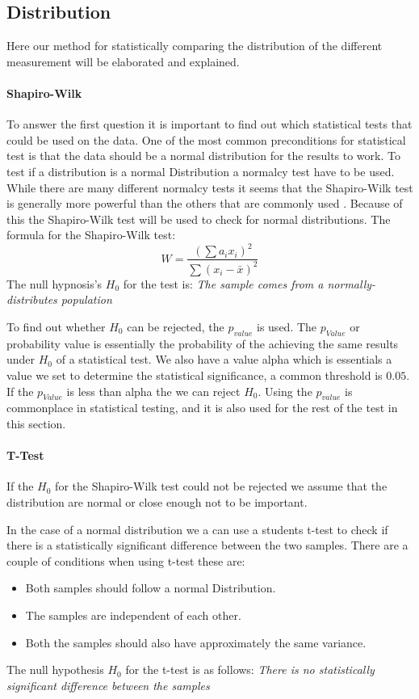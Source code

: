 \subsection{Distribution}
Here our method for statistically comparing the distribution of the different measurement will be elaborated and explained.
\paragraph{Shapiro-Wilk}
To answer the first question it is important to find out which statistical tests that could be used on the data. One of the most common preconditions for statistical test is that the data should be a normal distribution for the results to work. To test if a distribution is a normal Distribution a normalcy test have to be used. While there are many different normalcy tests it seems that the Shapiro-Wilk test is generally more powerful than the others that are commonly used \cite{razali2011power}. Because of this the Shapiro-Wilk test will be used to check for normal distributions. The formula for the Shapiro-Wilk test:
$$W=\frac{( \sum{a_i x_i} )^2}{\sum{(x_i - \bar{x})^2}}$$
The null hypnosis's $H_0$ for the test is:
\textit{The sample comes from a normally-distributes population}

To find out whether $H_0$ can be rejected, the $p_{value}$ is used. The $p_{Value}$ or probability value is essentially the probability of the achieving the same results under $H_0$ of a statistical test. We also have a value alpha which is essentials a value we set to determine the statistical significance, a common threshold is $0.05$. If the $p_{Value}$ is less than alpha the we can reject $H_0$. Using the $p_{value}$ is commonplace in statistical testing, and it is also used for the rest of the test in this section.
\paragraph{T-Test}
If the $H_0$ for the Shapiro-Wilk test could not be rejected we assume that the distribution are normal or close enough not to be important.

In the case of a normal distribution we a can use a students t-test to check if there is a statistically significant difference between the two samples. There are a couple of conditions when using t-test these are:
\begin{itemize}
    \item Both samples should follow a normal Distribution.
    \item The samples are independent of each other.
    \item Both the samples should also have approximately the same variance.
\end{itemize}
The null hypothesis $H_0$ for the t-test is as follows: \textit{There is no statistically significant difference between the samples}

